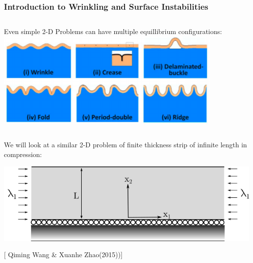 \documentclass{beamer}
\begin{document}
\begin{frame}
	\frametitle{\large Introduction to Wrinkling and Surface Instabilities}	
	\begin{columns}
 	\scriptsize{Even simple 2-D Problems can have multiple equillibrium configurations:
	}
	\includegraphics[width = \textwidth]{myFigures/basic_bifs}
	\end{columns} 	
	\vspace{0.1in}
	
	We will look at a similar 2-D problem of finite thickness strip of infinite length in compression:
	
		\begin{center}	
		\includegraphics[scale=0.25]{myFigures/compressed_strip_drawing}
	\end{center}
	
	
	\scriptsize[\color{orange} Qiming Wang \& Xuanhe Zhao(2015))\color{black}]	
\end{frame}
\end{document}
